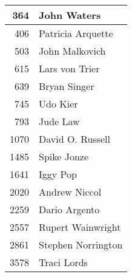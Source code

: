 \documentclass[dvipsnames]{beamer}
\theoremstyle{plain}
\begin{document}
\begin{frame}
\begin{columns}[b]
    \begin{tiny}
    \begin{table}
      \begin{tabular}{|r|l|}\hline
 364 & John Waters          \\\hline
 406 & Patricia Arquette    \\\hline
 503 & John Malkovich       \\\hline
 615 & Lars von Trier       \\\hline
 639 & Bryan Singer         \\\hline
 745 & Udo Kier             \\\hline
 793 & Jude Law             \\\hline
1070 & David O. Russell     \\\hline
1485 & Spike Jonze          \\\hline
1641 & Iggy Pop             \\\hline
2020 & Andrew Niccol        \\\hline
2259 & Dario Argento        \\\hline
2557 & Rupert Wainwright    \\\hline
2861 & Stephen Norrington   \\\hline
3578 & Traci Lords          \\\hline
      \end{tabular}
    \end{table}
    \end{tiny}
  \end{columns}
\end{frame}
\end{document}

